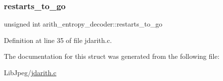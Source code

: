 \subsubsection{\texorpdfstring{restarts\_to\_go}{restarts\_to\_go}}
{\footnotesize\ttfamily unsigned int arith\+\_\+entropy\+\_\+decoder\+::restarts\+\_\+to\+\_\+go}



Definition at line 35 of file jdarith.\+c.



The documentation for this struct was generated from the following file\+:\begin{DoxyCompactItemize}
\item 
Lib\+Jpeg/\mbox{\hyperlink{jdarith_8c}{jdarith.\+c}}\end{DoxyCompactItemize}

